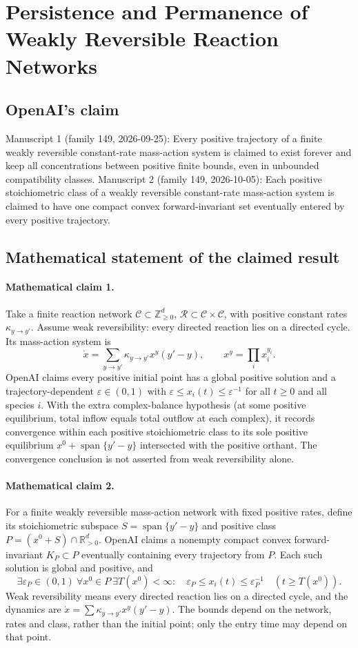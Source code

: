 \documentclass[11pt]{article}
\begin{document}
\section*{Persistence and Permanence of Weakly Reversible Reaction Networks}

\subsection{OpenAI's claim}
Manuscript 1 (family 149, 2026-09-25): Every positive trajectory of a finite weakly reversible constant-rate mass-action system is claimed to exist forever and keep all concentrations between positive finite bounds, even in unbounded compatibility classes. Manuscript 2 (family 149, 2026-10-05): Each positive stoichiometric class of a weakly reversible constant-rate mass-action system is claimed to have one compact convex forward-invariant set eventually entered by every positive trajectory.

\subsection{Mathematical statement of the claimed result}
\paragraph{Mathematical claim 1.} Take a finite reaction network $\mathcal C\subset\mathbb Z_{\ge0}^d$, $\mathcal R\subset\mathcal C\times\mathcal C$, with positive constant rates $\kappa_{y\to y'}$. Assume weak reversibility: every directed reaction lies on a directed cycle. Its mass-action system is
\[
\dot x=\sum_{y\to y'}\kappa_{y\to y'}x^y(y'-y),\qquad x^y=\prod_i x_i^{y_i}.
\]
OpenAI claims every positive initial point has a global positive solution and a trajectory-dependent $\varepsilon\in(0,1)$ with $\varepsilon\le x_i(t)\le\varepsilon^{-1}$ for all $t\ge0$ and all species $i$.
With the extra complex-balance hypothesis (at some positive equilibrium, total inflow equals total outflow at each complex), it records convergence within each positive stoichiometric class to its sole positive equilibrium $x^0+\operatorname{span}\{y'-y\}$ intersected with the positive orthant. The convergence conclusion is not asserted from weak reversibility alone.

\paragraph{Mathematical claim 2.} For a finite weakly reversible mass-action network with fixed positive rates, define its stoichiometric subspace $S=\operatorname{span}\{y'-y\}$ and positive class $P=(x^0+S)\cap\mathbb R_{>0}^d$. OpenAI claims a nonempty compact convex forward-invariant $K_P\subset P$ eventually containing every trajectory from $P$. Each such solution is global and positive, and
\[
\exists\varepsilon_P\in(0,1)\ \forall x^0\in P\ \exists T(x^0)<\infty:\quad
\varepsilon_P\le x_i(t)\le\varepsilon_P^{-1}\quad(t\ge T(x^0)).
\]
Weak reversibility means every directed reaction lies on a directed cycle, and the dynamics are $\dot x=\sum\kappa_{y\to y'}x^y(y'-y)$. The bounds depend on the network, rates and class, rather than the initial point; only the entry time may depend on that point.
\end{document}
